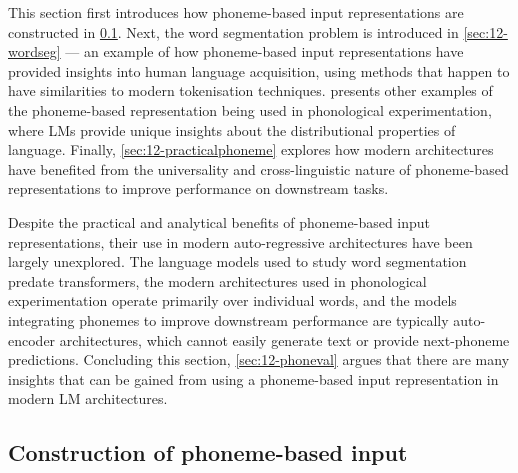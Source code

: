 
This section first introduces how phoneme-based input representations are constructed in \cref{sec:12-implementphoneme}. Next, the word segmentation problem is introduced in \cref{sec:12-wordseg} --- an example of how phoneme-based input representations have provided insights into human language acquisition, using methods that happen to have similarities to modern tokenisation techniques.  presents other examples of the phoneme-based representation being used in phonological experimentation, where LMs provide unique insights about the distributional properties of language. Finally, \cref{sec:12-practicalphoneme} explores how modern architectures have benefited from the universality and cross-linguistic nature of phoneme-based representations to improve performance on downstream tasks.

Despite the practical and analytical benefits of phoneme-based input representations, their use in modern auto-regressive architectures have been largely unexplored. The language models used to study word segmentation predate transformers, the modern architectures used in phonological experimentation operate primarily over individual words, and the models integrating phonemes to improve downstream performance are typically auto-encoder architectures, which cannot easily generate text or provide next-phoneme predictions. Concluding this section, \cref{sec:12-phoneval} argues that there are many insights that can be gained from using a phoneme-based input representation in modern LM architectures.


\subsection{Construction of phoneme-based input}\label{sec:12-implementphoneme}


